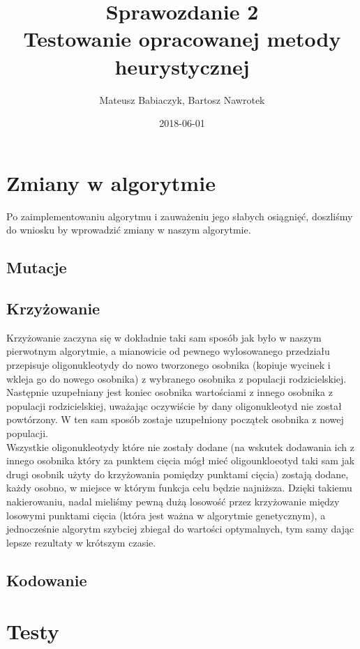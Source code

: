 \documentclass{article}
\title{Sprawozdanie 2 \\ Testowanie opracowanej metody heurystycznej}
\date{2018-06-01}
\author{Mateusz Babiaczyk, Bartosz Nawrotek}
\begin{document}
\maketitle
\section{Zmiany w algorytmie}  
Po zaimplementowaniu algorytmu i zauważeniu jego słabych osiągnięć, doszliśmy do wniosku by wprowadzić zmiany w naszym algorytmie. 
\subsection{Mutacje}
\subsection{Krzyżowanie}
Krzyżowanie zaczyna się w dokładnie taki sam sposób jak było w naszym pierwotnym algorytmie, a mianowicie od pewnego wylosowanego przedziału przepisuje oligonukleotydy do nowo tworzonego osobnika (kopiuje wycinek i wkleja go do nowego osobnika) z wybranego osobnika z populacji rodzicielskiej. Następnie uzupełniany jest koniec osobnika wartościami z innego osobnika z populacji rodzicielskiej, uważając oczywiście by dany oligonukleotyd nie został powtórzony. W ten sam sposób zostaje uzupełniony początek osobnika z nowej populacji. \\ Wszystkie oligonukleotydy które nie zostały dodane (na wskutek dodawania ich z innego osobnika który za punktem cięcia mógł mieć oligounkloeotyd taki sam jak drugi osobnik użyty do krzyżowania pomiędzy punktami cięcia) zostają dodane, każdy osobno, w miejsce w którym funkcja celu będzie najniższa. Dzięki takiemu nakierowaniu, nadal mieliśmy pewną dużą losowość przez krzyżowanie między losowymi punktami cięcia (która jest ważna w algorytmie genetycznym), a jednocześnie algorytm szybciej zbiegał do wartości optymalnych, tym samy dając lepsze rezultaty w krótszym czasie.
\subsection{Kodowanie}
\section{Testy}
\end{document}

